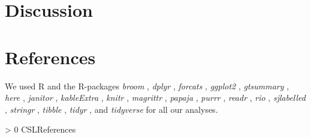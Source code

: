\documentclass[
  english,
  man]{apa6}
\newlength{\cslhangindent}
\newenvironment{CSLReferences}[3] %
 {%
  \setlength{\parindent}{0pt}
  \ifodd #1 \everypar{\setlength{\hangindent}{\cslhangindent}}\ignorespaces\fi
  \ifnum #2 > 0
  \setlength{\parskip}{#2\baselineskip}
  \fi
 }%
 {}
\begin{document}
{%
\section{Discussion}\label{discussion}}

\newpage

\hypertarget{references}{%
\section{References}\label{references}}

We used R \autocite[Version 3.6.1;][]{R-base} and the R-packages \emph{broom} \autocite[Version 0.7.0;][]{R-broom}, \emph{dplyr} \autocite[Version 1.0.2;][]{R-dplyr}, \emph{forcats} \autocite[Version 0.5.0;][]{R-forcats}, \emph{ggplot2} \autocite[Version 3.3.2;][]{R-ggplot2}, \emph{gtsummary} \autocite[Version 1.3.5;][]{R-gtsummary}, \emph{here} \autocite[Version 0.1;][]{R-here}, \emph{janitor} \autocite[Version 2.0.1;][]{R-janitor}, \emph{kableExtra} \autocite[Version 1.3.1;][]{R-kableExtra}, \emph{knitr} \autocite[Version 1.29;][]{R-knitr}, \emph{magrittr} \autocite[Version 1.5;][]{R-magrittr}, \emph{papaja} \autocite[Version 0.1.0.9997;][]{R-papaja}, \emph{purrr} \autocite[Version 0.3.4;][]{R-purrr}, \emph{readr} \autocite[Version 1.3.1;][]{R-readr}, \emph{rio} \autocite[Version 0.5.16;][]{R-rio}, \emph{sjlabelled} \autocite[Version 1.1.7;][]{R-sjlabelled}, \emph{stringr} \autocite[Version 1.4.0;][]{R-stringr}, \emph{tibble} \autocite[Version 3.0.4;][]{R-tibble}, \emph{tidyr} \autocite[Version 1.1.2;][]{R-tidyr}, and \emph{tidyverse} \autocite[Version 1.3.0;][]{R-tidyverse} for all our analyses.

\begingroup
\setlength{\parindent}{-0.5in}
\setlength{\leftskip}{0.5in}

\hypertarget{refs}{}
\begin{CSLReferences}{0}{0}
\end{CSLReferences}

\endgroup


\printbibliography
\end{document}
